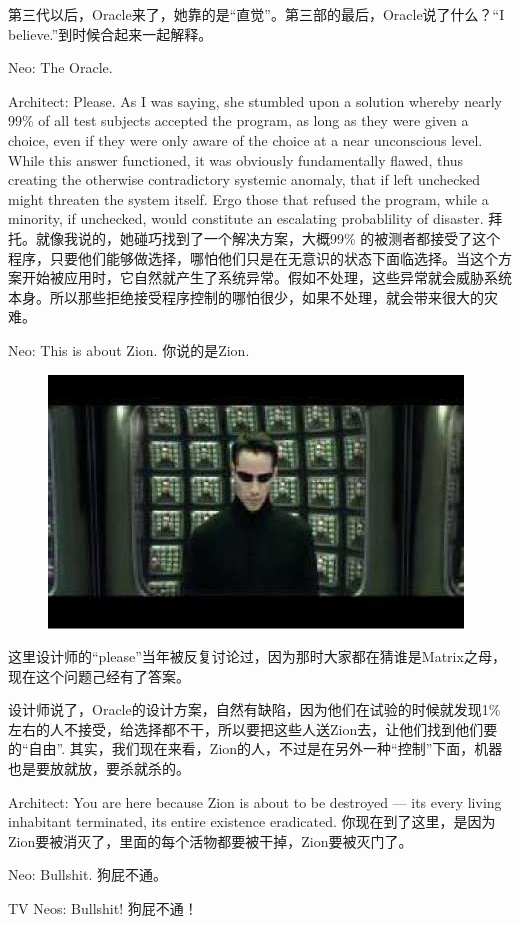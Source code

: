 \documentclass[UTF8]{ctexart}
\begin{document}
第三代以后，Oracle来了，她靠的是“直觉”。第三部的最后，Oracle说了什么？“I believe.”到时候合起来一起解释。

Neo: The Oracle.

Architect: Please. As I was saying, she stumbled upon a solution whereby nearly 99\% of all test subjects accepted the program, as long as they were given a choice, even if they were only aware of the choice at a near unconscious level. While this answer functioned, it was obviously fundamentally flawed, thus creating the otherwise contradictory systemic anomaly, that if left unchecked might threaten the system itself. Ergo those that refused the program, while a minority, if unchecked, would constitute an escalating probablility of disaster. 拜托。就像我说的，她碰巧找到了一个解决方案，大概99\% 的被测者都接受了这个程序，只要他们能够做选择，哪怕他们只是在无意识的状态下面临选择。当这个方案开始被应用时，它自然就产生了系统异常。假如不处理，这些异常就会威胁系统本身。所以那些拒绝接受程序控制的哪怕很少，如果不处理，就会带来很大的灾难。

Neo: This is about Zion. 你说的是Zion.

\begin{figure}[htb]
\centering
\includegraphics[width=0.5\linewidth]{fig/read_reloaded-163}
\end{figure}

这里设计师的“please”当年被反复讨论过，因为那时大家都在猜谁是Matrix之母，现在这个问题己经有了答案。

设计师说了，Oracle的设计方案，自然有缺陷，因为他们在试验的时候就发现1\% 左右的人不接受，给选择都不干，所以要把这些人送Zion去，让他们找到他们要的“自由”. 其实，我们现在来看，Zion的人，不过是在另外一种“控制”下面，机器也是要放就放，要杀就杀的。

Architect: You are here because Zion is about to be destroyed --- its every living inhabitant terminated, its entire existence eradicated. 你现在到了这里，是因为Zion要被消灭了，里面的每个活物都要被干掉，Zion要被灭门了。

Neo: Bullshit. 狗屁不通。

TV Neos: Bullshit! 狗屁不通！
\end{document}
